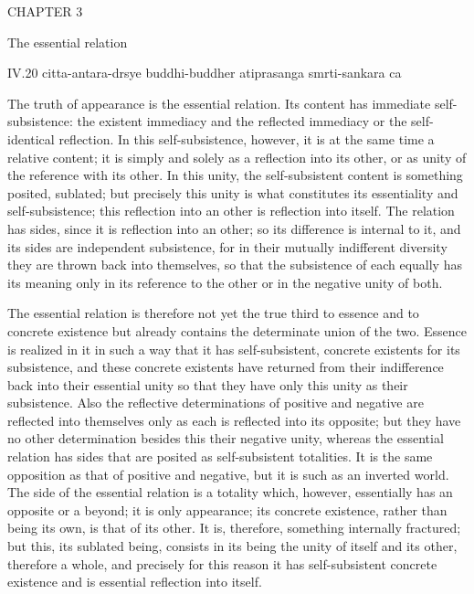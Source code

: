 CHAPTER 3

The essential relation

IV.20
citta-antara-drsye buddhi-buddher atiprasanga smrti-sankara ca

The truth of appearance is the essential relation.
Its content has immediate self-subsistence:
the existent immediacy and the reflected immediacy
or the self-identical reflection.
In this self-subsistence, however,
it is at the same time a relative content;
it is simply and solely as a reflection into its other,
or as unity of the reference with its other.
In this unity, the self-subsistent content is
something posited, sublated;
but precisely this unity is what constitutes
its essentiality and self-subsistence;
this reflection into an other is reflection into itself.
The relation has sides, since it is reflection into an other;
so its difference is internal to it,
and its sides are independent subsistence,
for in their mutually indifferent diversity
they are thrown back into themselves,
so that the subsistence of each equally has its meaning
only in its reference to the other
or in the negative unity of both.

The essential relation is therefore not yet
the true third to essence and to concrete existence
but already contains the determinate union of the two.
Essence is realized in it in such a way that
it has self-subsistent, concrete existents for its subsistence,
and these concrete existents have returned
from their indifference back into their essential unity
so that they have only this unity as their subsistence.
Also the reflective determinations of positive and negative are
reflected into themselves only as each is reflected into its opposite;
but they have no other determination besides this their negative unity,
whereas the essential relation has sides
that are posited as self-subsistent totalities.
It is the same opposition as that of positive and negative,
but it is such as an inverted world.
The side of the essential relation is a totality
which, however, essentially has an opposite or a beyond;
it is only appearance;
its concrete existence,
rather than being its own,
is that of its other.
It is, therefore, something internally fractured;
but this, its sublated being, consists in
its being the unity of itself and its other,
therefore a whole, and precisely for this reason
it has self-subsistent concrete existence
and is essential reflection into itself.

